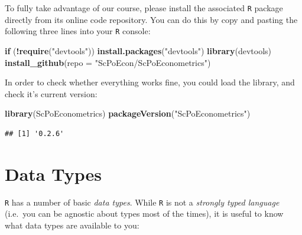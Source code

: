 \documentclass[]{book}
\newenvironment{Shaded}{\begin{snugshade}}{\end{snugshade}}
\newcommand{\KeywordTok}[1]{\textcolor[rgb]{0.13,0.29,0.53}{\textbf{#1}}}
\newcommand{\DataTypeTok}[1]{\textcolor[rgb]{0.13,0.29,0.53}{#1}}
\newcommand{\StringTok}[1]{\textcolor[rgb]{0.31,0.60,0.02}{#1}}
\newcommand{\ControlFlowTok}[1]{\textcolor[rgb]{0.13,0.29,0.53}{\textbf{#1}}}
\newcommand{\OperatorTok}[1]{\textcolor[rgb]{0.81,0.36,0.00}{\textbf{#1}}}
\newcommand{\NormalTok}[1]{#1}
\begin{document}
To fully take advantage of our course, please install the associated
\texttt{R} package directly from its online code repository. You can do
this by copy and pasting the following three lines into your \texttt{R}
console:

\begin{Shaded}
\begin{Highlighting}[]
\ControlFlowTok{if}\NormalTok{ (}\OperatorTok{!}\KeywordTok{require}\NormalTok{(}\StringTok{"devtools"}\NormalTok{)) }\KeywordTok{install.packages}\NormalTok{(}\StringTok{"devtools"}\NormalTok{)}
\KeywordTok{library}\NormalTok{(devtools)}
\KeywordTok{install_github}\NormalTok{(}\DataTypeTok{repo =} \StringTok{"ScPoEcon/ScPoEconometrics"}\NormalTok{)}
\end{Highlighting}
\end{Shaded}

In order to check whether everything works fine, you could load the
library, and check it's current version:

\begin{Shaded}
\begin{Highlighting}[]
\KeywordTok{library}\NormalTok{(ScPoEconometrics)}
\KeywordTok{packageVersion}\NormalTok{(}\StringTok{"ScPoEconometrics"}\NormalTok{)}
\end{Highlighting}
\end{Shaded}

\begin{verbatim}
## [1] '0.2.6'
\end{verbatim}

\section{Data Types}\label{data-types}

\texttt{R} has a number of basic \emph{data types}. While \texttt{R} is
not a \emph{strongly typed language} (i.e.~you can be agnostic about
types most of the times), it is useful to know what data types are
available to you:
\end{document}
